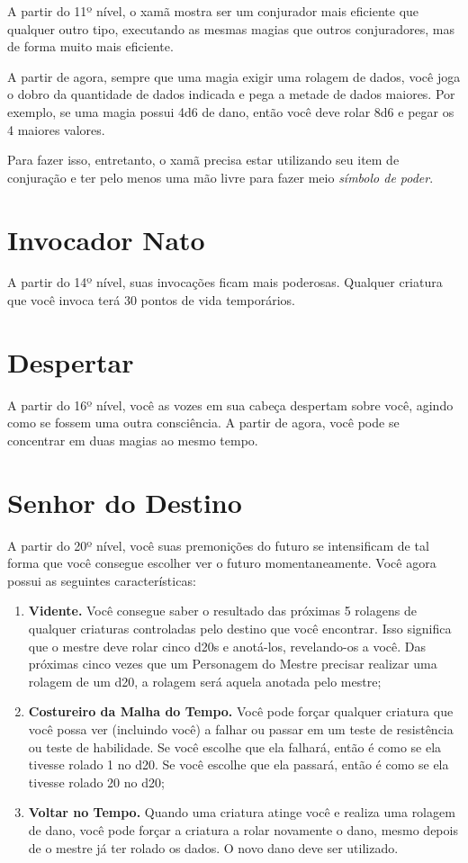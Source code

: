 \begin{multicols}{2}
A partir do 11º nível, o xamã mostra ser um conjurador mais eficiente que
qualquer outro tipo, executando as mesmas magias que outros conjuradores, mas de
forma muito mais eficiente.

A partir de agora, sempre que uma magia exigir uma rolagem de dados, você joga o
dobro da quantidade de dados indicada e pega a metade de dados maiores. Por
exemplo, se uma magia possui 4d6 de dano, então você deve rolar 8d6 e pegar os
4 maiores valores.

Para fazer isso, entretanto, o xamã precisa estar utilizando seu item de
conjuração e ter pelo menos uma mão livre para fazer meio \textit{símbolo de
poder}.

\section*{Invocador Nato}%

A partir do 14º nível, suas invocações ficam mais poderosas. Qualquer criatura
que você invoca terá 30 pontos de vida temporários.

\section*{Despertar}%

A partir do 16º nível, você as vozes em sua cabeça despertam sobre você, agindo
como se fossem uma outra consciência. A partir de agora, você pode se concentrar
em duas magias ao mesmo tempo.

\section*{Senhor do Destino}%

A partir do 20º nível, você suas premonições do futuro se intensificam de tal
forma que você consegue escolher ver o futuro momentaneamente. Você agora possui
as seguintes características:
\begin{enumerate}
    \item \textbf{Vidente.} Você consegue saber o resultado das próximas 5
        rolagens de qualquer criaturas controladas pelo destino que você
        encontrar. Isso significa que o mestre deve rolar cinco d20s e
        anotá-los, revelando-os a você. Das próximas cinco vezes que um
        Personagem do Mestre precisar realizar uma rolagem de um d20, a rolagem
        será aquela anotada pelo mestre;
    \item \textbf{Costureiro da Malha do Tempo.} Você pode forçar qualquer
        criatura que você possa ver (incluindo você) a falhar ou passar em um
        teste de resistência ou teste de habilidade. Se você escolhe que ela
        falhará, então é como se ela tivesse rolado 1 no d20. Se você escolhe
        que ela passará, então é como se ela tivesse rolado 20 no d20;
    \item \textbf{Voltar no Tempo.} Quando uma criatura atinge você e realiza
        uma rolagem de dano, você pode forçar a criatura a rolar novamente o
        dano, mesmo depois de o mestre já ter rolado os dados. O novo dano deve
        ser utilizado.
\end{enumerate}


\end{multicols}
